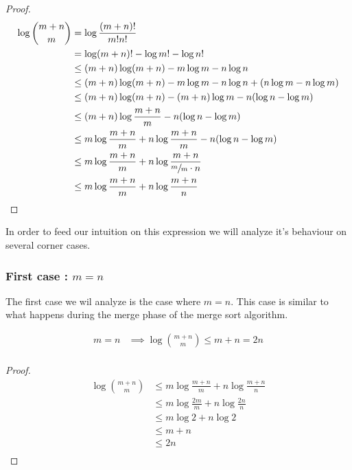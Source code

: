 \begin{proof}
\begin{align*}
\log\binom{m+n}{m} &= \log\frac{(m+n)!}{m!n!}\\
&= \log(m+n)! - \log m! - \log n!\\
&\leq (m+n) \log(m+n) - m \log m - n \log n\\
&\leq (m+n) \log(m+n) - m \log m - n \log n + (n \log m - n \log m)\\
&\leq (m+n) \log(m+n) - (m+n) \log m - n (\log n - \log m)\\
&\leq (m+n) \log\frac{m+n}{m} - n (\log n - \log m)\\
&\leq m \log\frac{m+n}{m} + n \log\frac{m+n}{m} - n (\log n - \log m)\\
&\leq m \log\frac{m+n}{m} + n \log\frac{m+n}{\sfrac{m}{m} \cdot n}\\
&\leq m \log\frac{m+n}{m} + n \log\frac{m+n}{n}\\
\end{align*}
\end{proof}



In order to feed our intuition on this expression we will analyze it's behaviour on several corner cases.


\subsubsection{First case\texorpdfstring{ : $m = n$}{}}


The first case we wil analyze is the case where $m = n$. This case is similar to what happens during the merge phase of the merge sort algorithm.

\begin{lemma}
\begin{align*}
m = n &\implies \log\binom{m+n}{m} \leq m + n = 2n\\
\end{align*}
\end{lemma}

\begin{proof}
\begin{align*}
\log\binom{m+n}{m} &\leq m \log\frac{m+n}{m} + n \log\frac{m+n}{n}\\
&\leq m \log\frac{2m}{m} + n \log\frac{2n}{n}\\
&\leq m \log 2 + n \log 2\\
&\leq m + n\\
&\leq 2n\\
\end{align*}
\end{proof}


